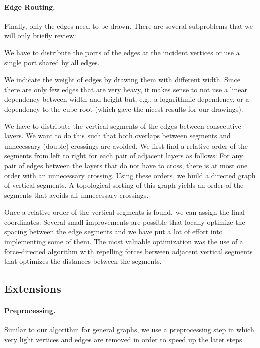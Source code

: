 \documentclass[]{llncs}
\begin{document}
\paragraph{Edge Routing.}
Finally, only the edges need to be drawn. There are several
subproblems that we will only briefly review:
\begin{compactitem}
  \item We have to distribute the ports of the edges at the incident
    vertices or use a single port shared by all edges.
  \item We indicate the weight of edges by drawing them with
    different width. Since there are only few edges that are very
    heavy, it makes sense to not use a linear dependency between width
    and height but, e.g., a logarithmic dependency, or a dependency to
    the cube root (which gave the nicest results for our drawings).
  \item We have to distribute the vertical segments of the edges
    between consecutive layers. We want to do this such that
    both overlaps between segments and unnecessary (double) crossings
    are avoided. We first find a relative order of the
    segments from left to right for each pair of adjacent layers as
    follows: For any pair of edges between the layers that do not have
    to cross, there is at most one order with an
    unnecessary crossing. Using these orders, we build a directed
    graph of vertical segments. A topological sorting of this graph
    yields an order of the segments that avoids all unnecessary
    crossings.

    Once a relative order of the vertical segments is found, we can
    assign the final coordinates. Several small improvements are
    possible that locally optimize the spacing between the edge
    segments and we have put a lot of effort into implementing
    some of them.  The most valuable optimization was the use of a
    force-directed algorithm with repelling forces between adjacent
    vertical segments that optimizes the distances between the
    segments.
\end{compactitem}

\subsection{Extensions}

\paragraph{Preprocessing.}
Similar to our algorithm for general graphs, we use a preprocessing
step in which very light vertices and edges are removed in order to
speed up the later steps.
\end{document}
